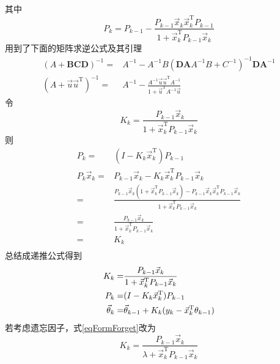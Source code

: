 其中
\begin{equation*}
    P_k = P_{k-1}-\frac{P_{k-1}\vec{x}_k\vec{x}_k^\mathrm{T}
    P_{k-1}}{1+\vec{x}_k^\mathrm{T}P_{k-1}\vec{x}_k}
\end{equation*}
用到了下面的矩阵求逆公式及其引理
\begin{align*}
    (A+\mathbf{BCD})^{-1} =& A^{-1}-A^{-1} B
    (\mathbf{DA} A^{-1} B+C^{-1})^{-1} \mathbf{D A}^{-1} \\
    (A+\vec{u}\vec{u}^\text{T})^{-1} =& A^{-1}
    -\frac{A^{-1}\vec{u}\vec{u}^\text{T} A^{-1}}
    {1+\vec{u}^\text{T}A^{-1}\vec{u}}
\end{align*}
令
\begin{equation*}
    K_k = \frac{P_{k-1}\vec{x}_k}
    {1+\vec{x}_k^\mathrm{T}P_{k-1}\vec{x}_k}
\end{equation*}
则
\begin{align*}
    P_k =& (I-K_k\vec{x}_k^\mathrm{T})P_{k-1}\\
    P_k\vec{x}_k =& P_{k-1}\vec{x}_k
    -K_k\vec{x}_k^\mathrm{T}P_{k-1}\vec{x}_k \\
    =& \frac{P_{k-1}\vec{x}_k
    (1+\vec{x}_k^\mathrm{T}P_{k-1}\vec{x}_k)
    -P_{k-1}\vec{x}_k\vec{x}_k^\mathrm{T}
    P_{k-1}\vec{x}_k}
    {1+\vec{x}_k^\mathrm{T}P_{k-1}\vec{x}_k} \\
    =& \frac{P_{k-1}\vec{x}_k}
    {1+\vec{x}_k^\mathrm{T}P_{k-1}\vec{x}_k} \\
    =& K_k \\
\end{align*}
总结成递推公式得到
\begin{align}
    K_k =& \frac{P_{k-1}\vec{x}_k}{1+\vec{x}_k^\mathrm{T}
    P_{k-1}\vec{x}_k} \label{eqFormForget}\\
    P_k =& (I-K_k\vec{x}_k^\mathrm{T})P_{k-1} \notag\\
    \vec{\theta}_k =& \vec{\theta}_{k-1}
    +K_k(y_k-\vec{x}_k^\mathrm{T}\theta_{k-1}) \notag
\end{align}
若考虑遗忘因子，式\eqref{eqFormForget}改为
\begin{equation*}
    K_k = \frac{P_{k-1}\vec{x}_k}
    {\lambda+\vec{x}_k^\mathrm{T}P_{k-1}\vec{x}_k}
\end{equation*}
